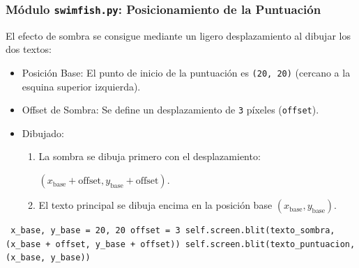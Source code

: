 \documentclass[
	11pt, %
]{beamer}
\begin{document}
\begin{frame}[fragile] \frametitle{Módulo \texttt{swimfish.py}: Posicionamiento de la Puntuación}

El efecto de sombra se consigue mediante un ligero desplazamiento al dibujar los dos textos:

\begin{itemize} \item Posición Base: El punto de inicio de la puntuación es \texttt{(20, 20)} (cercano a la esquina superior izquierda). \item Offset de Sombra: Se define un desplazamiento de \texttt{3} píxeles (\texttt{offset}). \item Dibujado: \begin{enumerate} \item La sombra se dibuja primero con el desplazamiento:

$(x_{\text{base}} + \text{offset}, y_{\text{base}} + \text{offset})$.
\item El texto principal se dibuja encima en la posición base $(x_{\text{base}}, y_{\text{base}})$.
\end{enumerate}
\end{itemize}

\vspace{4pt} {\scriptsize \begin{verbatim} x_base, y_base = 20, 20 offset = 3 self.screen.blit(texto_sombra, (x_base + offset, y_base + offset)) self.screen.blit(texto_puntuacion, (x_base, y_base)) \end{verbatim} } \end{frame}

\end{document}
